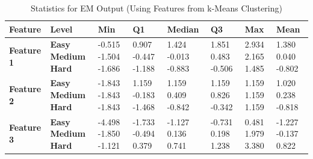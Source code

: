 \documentclass[12pt]{article}
\begin{document}
	\begin{center}
	\begin{table}[h]
		\begin{tabular}{ | m{2cm} | m{1.7cm} | m{1.3cm} | m{1.3cm} | m{1.5cm} | m{1.3cm} | m{1.3cm} | m{1.3cm} | }
		\hline
		\textbf{Feature} & \textbf{Level} & \textbf{Min} & \textbf{Q1} & \textbf{Median} & \textbf{Q3} & \textbf{Max} & \textbf{Mean}\\ 
		\hline
		\textbf{Feature 1} & \textbf{Easy Medium Hard} & -0.515 \hspace{5mm}-1.504 \hspace{5mm}-1.686 & 0.907 \hspace{5mm}-0.447 \hspace{5mm}-1.188 & 1.424  \hspace{5mm}-0.013 \hspace{5mm}-0.883 & 1.851 \hspace{5mm}0.483 \hspace{5mm}-0.506 & 2.934 \hspace{5mm}2.165 \hspace{5mm}1.485 & 1.380 \hspace{5mm}0.040 \hspace{5mm}-0.802\\
		\hline
		\textbf{Feature 2} & \textbf{Easy Medium Hard} & -1.843 \hspace{5mm}-1.843 \hspace{5mm}-1.843 & 1.159 \hspace{5mm}-0.183 \hspace{5mm}-1.468 & 1.159  \hspace{5mm}0.409 \hspace{5mm}-0.842 & 1.159 \hspace{5mm}0.826 \hspace{5mm}-0.342 & 1.159 \hspace{5mm}1.159 \hspace{5mm}1.159 & 1.020 \hspace{5mm}0.238 \hspace{5mm}-0.818\\
		\hline
		\textbf{Feature 3} & \textbf{Easy Medium Hard} & -4.498 \hspace{5mm}-1.850 \hspace{5mm}-1.121 & -1.733 \hspace{5mm}-0.494 \hspace{5mm}0.379 & -1.127  \hspace{5mm}0.136 \hspace{5mm}0.741 & -0.731 \hspace{5mm}0.198 \hspace{5mm}1.238 & 0.481 \hspace{5mm}1.979 \hspace{5mm}3.380 & -1.227 \hspace{5mm}-0.137 \hspace{5mm}0.822\\
		\hline
		\end{tabular}
		\caption{Statistics for EM Output (Using Features from k-Means Clustering)}
	\end{table}
	\end{center}
	
\end{document}
